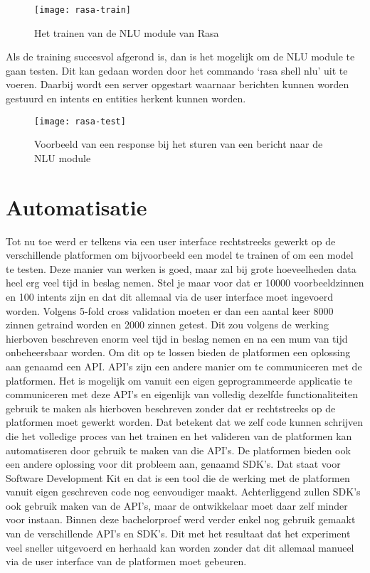 \begin{figure}[H]
    \label{fig:rasa-train}
    \centering
    \texttt{[image: rasa-train]}
    \caption{Het trainen van de NLU module van Rasa}
\end{figure}

Als de training succesvol afgerond is, dan is het mogelijk om de NLU module te gaan testen. Dit kan gedaan worden door het commando ‘rasa shell nlu’ uit te voeren. Daarbij wordt een server opgestart waarnaar berichten kunnen worden gestuurd en intents en entities herkent kunnen worden. 

\begin{figure}[H]
    \label{fig:rasa-test}
    \centering
    \texttt{[image: rasa-test]}
    \caption{Voorbeeld van een response bij het sturen van een bericht naar de NLU module}
\end{figure}

\section{Automatisatie}
\label{sec:automatisatie}

Tot nu toe werd er telkens via een user interface rechtstreeks gewerkt op de verschillende platformen om bijvoorbeeld een model te trainen of om een model te testen. Deze manier van werken is goed, maar zal bij grote hoeveelheden data heel erg veel tijd in beslag nemen. Stel je maar voor dat er 10000 voorbeeldzinnen  en 100 intents zijn en dat dit allemaal via de user interface moet ingevoerd worden. Volgens 5-fold cross validation moeten er dan een aantal keer 8000 zinnen getraind worden en 2000 zinnen getest. Dit zou volgens de werking hierboven beschreven enorm veel tijd in beslag nemen en na een mum van tijd onbeheersbaar worden. Om dit op te lossen bieden de platformen een oplossing aan genaamd een API. API’s zijn een andere manier om te communiceren met de platformen. Het is mogelijk om vanuit een eigen geprogrammeerde applicatie te communiceren met deze API’s en eigenlijk van volledig dezelfde functionaliteiten gebruik te maken als hierboven beschreven zonder dat er rechtstreeks op de platformen moet gewerkt worden. Dat betekent dat we zelf code kunnen schrijven die het volledige proces van het trainen en het valideren van de platformen kan automatiseren door gebruik te maken van die API’s. De platformen bieden ook een andere oplossing voor dit probleem aan, genaamd SDK's. Dat staat voor Software Development Kit en dat is een tool die de werking met de platformen vanuit eigen geschreven code nog eenvoudiger maakt. Achterliggend zullen SDK's ook gebruik maken van de API's, maar de ontwikkelaar moet daar zelf minder voor instaan. Binnen deze bachelorproef werd verder enkel nog gebruik gemaakt van de verschillende API’s en SDK's. Dit met het resultaat dat het experiment veel sneller uitgevoerd en herhaald kan worden zonder dat dit allemaal manueel via de user interface van de platformen moet gebeuren.

